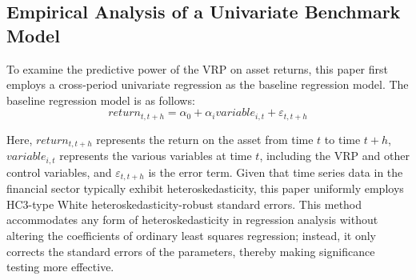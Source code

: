 \documentclass[a4paper, 12pt]{article}    %
\begin{document}
\subsection{Empirical Analysis of a Univariate Benchmark Model}
        To examine the predictive power of the VRP on asset returns, this paper first employs a cross-period univariate regression as the baseline regression model. The baseline regression model is as follows:
        \begin{equation} \label{base}
		return_{t,t+h} = \alpha_0 + \alpha_i variable_{i,t} + \varepsilon_{t,t+h}
	\end{equation}
    
            Here, $return_{t,t+h}$ represents the return on the asset from time $t$ to time $t+h$, $variable_{i,t}$ represents the various variables at time $t$, including the VRP and other control variables, and $\varepsilon_{t,t+h}$ is the error term.
            Given that time series data in the financial sector typically exhibit heteroskedasticity, this paper uniformly employs HC3-type White heteroskedasticity-robust standard errors. This method accommodates any form of heteroskedasticity in regression analysis without altering the coefficients of ordinary least squares regression; instead, it only corrects the standard errors of the parameters, thereby making significance testing more effective.
            
\end{document}
